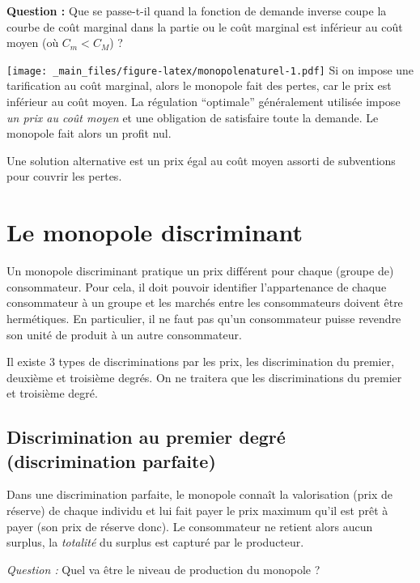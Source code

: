 \documentclass[
]{book}
\theoremstyle{definition}
\theoremstyle{definition}
\theoremstyle{definition}
\theoremstyle{definition}
\theoremstyle{remark}
\begin{document}
\textbf{Question :} Que se passe-t-il quand la fonction de demande inverse coupe la courbe de coût marginal dans la partie ou le coût marginal est inférieur au coût moyen (où \(C_m<C_M\)) ?

\texttt{[image: \_main\_files/figure-latex/monopolenaturel-1.pdf]}
Si on impose une tarification au coût marginal, alors le monopole fait des pertes, car le prix est inférieur au coût moyen.
La régulation ``optimale'' généralement utilisée impose \emph{un prix au coût moyen} et une obligation de satisfaire toute la demande.
Le monopole fait alors un profit nul.

Une solution alternative est un prix égal au coût moyen assorti de subventions pour couvrir les pertes.

\hypertarget{le-monopole-discriminant}{%
\section{Le monopole discriminant}\label{le-monopole-discriminant}}

Un monopole discriminant pratique un prix différent pour chaque (groupe de) consommateur.
Pour cela, il doit pouvoir identifier l'appartenance de chaque consommateur à un groupe et les marchés entre les consommateurs doivent être hermétiques.
En particulier, il ne faut pas qu'un consommateur puisse revendre son unité de produit à un autre consommateur.

Il existe 3 types de discriminations par les prix, les discrimination du premier, deuxième et troisième degrés.
On ne traitera que les discriminations du premier et troisième degré.

\hypertarget{discrimination-au-premier-degruxe9-discrimination-parfaite}{%
\subsection{Discrimination au premier degré (discrimination parfaite)}\label{discrimination-au-premier-degruxe9-discrimination-parfaite}}

Dans une discrimination parfaite, le monopole connaît la valorisation (prix de réserve) de chaque individu et lui fait payer le prix maximum qu'il est prêt à payer (son prix de réserve donc).
Le consommateur ne retient alors aucun surplus, la \emph{totalité} du surplus est capturé par le producteur.

\emph{Question :} Quel va être le niveau de production du monopole ?
\end{document}
